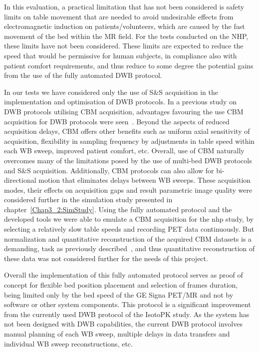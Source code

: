 In this evaluation, a practical limitation that has not been considered is safety limits on table movement that are needed to avoid undesirable effects from electromagnetic induction on patients/volunteers, which are caused by the fast movement of the bed within the MR field. For the tests conducted on the NHP, these limits have not been considered. These limits are expected to reduce the speed that would be permissive for human subjects, in compliance also with patient comfort requirements, and thus reduce to some degree the potential gains from the use of the fully automated DWB protocol. 

In our tests we have considered only the use of S\&S acquisition in the implementation and optimisation of DWB protocols. 
In a previous study on DWB protocols utilising CBM acquisition, advantages favouring the use CBM acquisition for DWB protocols were seen~\cite{Karakatsanis2016a}. Beyond the aspects of reduced acquisition delays, CBM offers other benefits such as uniform axial sensitivity of acquisition, flexibility in sampling frequency by adjustments in table speed within each WB sweep, improved patient comfort, etc. 
Overall, use of CBM naturally overcomes many of the limitations posed by the use of multi-bed DWB protocols and S\&S acquisition. 
Additionally, CBM protocols can also allow for bi-directional motion that eliminates delays between WB sweeps. 
These acquisition modes, their effects on acquisition gaps and result parametric image quality were considered further in the simulation study presented in chapter~\ref{Chap3_2:SimStudy}.
Using the fully automated protocol and the developed tools we were able to emulate a CBM acquisition for the \gls{nhp} study, by selecting a relatively slow table speeds and recording PET data continuously. But normalization and quantitative reconstruction of the acquired CBM datasets is a demanding, task as previously described~\cite{Panin2014}, and thus quantitative reconstruction of these data was not considered further for the needs of this project.

Overall the implementation of this fully automated protocol serves as proof of concept for flexible bed position placement and selection of frames duration, being limited only by the bed speed of the GE Signa PET/MR and not by software or other system components. This protocol is a significant improvement from the currently used DWB protocol of the IsotoPK study. As the system has not been designed with DWB capabilities, the current DWB protocol involves manual planning of each WB sweep, multiple delays in data transfers and individual WB sweep reconstructions, etc. 

